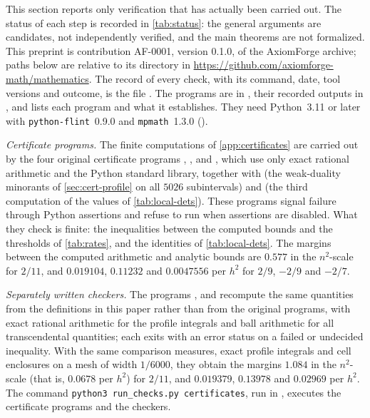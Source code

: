 
This section reports only verification that has actually been carried out. The status of each step is recorded in \cref{tab:status}: the general arguments are candidates, not independently verified, and the main theorems are not formalized. This preprint is contribution AF-0001, version 0.1.0, of the AxiomForge archive; paths below are relative to its directory  in \url{https://github.com/axiomforge-math/mathematics}. The record of every check, with its command, date, tool versions and outcome, is the file . The programs are in , their recorded outputs in , and  lists each program and what it establishes. They need Python~3.11 or later with \texttt{python-flint}~0.9.0 and \texttt{mpmath}~1.3.0 ().

\emph{Certificate programs.} The finite computations of \cref{app:certificates} are carried out by the four original certificate programs , ,  and , which use only exact rational arithmetic and the Python standard library, together with  (the weak-duality minorants of \cref{sec:cert-profile} on all $5026$ subintervals) and  (the third computation of the values of \cref{tab:local-dets}). These programs signal failure through Python assertions and refuse to run when assertions are disabled. What they check is finite: the inequalities between the computed bounds and the thresholds of \cref{tab:rates}, and the identities of \cref{tab:local-dets}. The margins between the computed arithmetic and analytic bounds are $0.577$ in the $n^2$-scale for $2/11$, and $0.019104$, $0.11232$ and $0.0047556$ per $h^2$ for $2/9$, $-2/9$ and $-2/7$.

\emph{Separately written checkers.} The programs ,  and  recompute the same quantities from the definitions in this paper rather than from the original programs, with exact rational arithmetic for the profile integrals and ball arithmetic for all transcendental quantities; each exits with an error status on a failed or undecided inequality. With the same comparison measures, exact profile integrals and cell enclosures on a mesh of width $1/6000$, they obtain the margins $1.084$ in the $n^2$-scale (that is, $0.0678$ per $h^2$) for $2/11$, and $0.019379$, $0.13978$ and $0.02969$ per $h^2$. The command \texttt{python3 run\_checks.py certificates}, run in , executes the certificate programs and the checkers.

